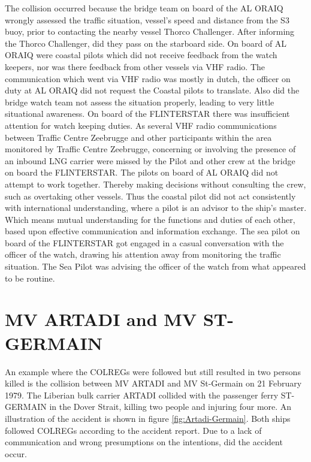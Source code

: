 The collision occurred because the bridge team on board of the AL ORAIQ wrongly assessed the traffic situation, vessel's speed and distance from the S3 buoy, prior to contacting the nearby vessel Thorco Challenger. After informing the Thorco Challenger, did they pass on the starboard side. On board of AL ORAIQ were coastal pilots which did not receive feedback from the watch keepers, nor was there feedback from other vessels via \ac{VHF} radio. The communication which went via VHF radio was mostly in dutch, the officer on duty at AL ORAIQ did not request the Coastal pilots to translate. Also did the bridge watch team not assess the situation properly, leading to very little situational awareness.
On board of the FLINTERSTAR there was insufficient attention for watch keeping duties. As several VHF radio communications between Traffic Centre Zeebrugge and other participants within the area monitored by Traffic Centre Zeebrugge, concerning or involving the presence of an inbound LNG carrier were missed by the Pilot and other crew at the bridge on board the FLINTERSTAR.
The pilots on board of AL ORAIQ did not attempt to work together. Thereby making decisions without consulting the crew, such as overtaking other vessels. Thus the coastal pilot did not act consistently with international understanding, where a pilot is an advisor to the ship's master. Which means mutual understanding for the functions and duties of each other, based upon effective communication and information exchange. 
The sea pilot on board of the FLINTERSTAR got engaged in a casual conversation with the officer of the watch, drawing his attention away from monitoring the traffic situation. The Sea Pilot was advising the officer of the watch from what appeared to be routine. \cite{Backer2015}

\newpage
\section{MV ARTADI and MV ST-GERMAIN}
An example where the \ac{COLREGs} were followed but still resulted in two persons killed is the collision between MV ARTADI and MV St-Germain on 21 February 1979. The Liberian bulk carrier ARTADI collided with the passenger ferry ST-GERMAIN in the Dover Strait, killing two people and injuring four more. An illustration of the accident is shown in figure \ref{fig:Artadi-Germain}. Both ships followed  \ac{COLREGs} according to the accident report. Due to a lack of communication and wrong presumptions on the intentions, did the accident occur.

